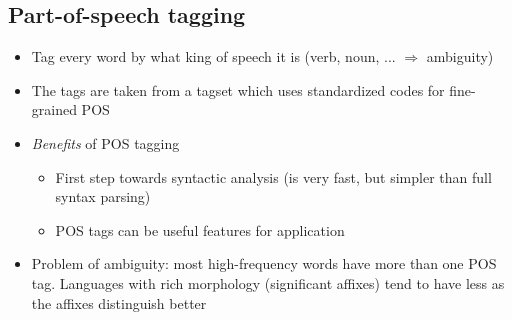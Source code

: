 \subsection{Part-of-speech tagging}
\begin{itemize}
	\item Tag every word by what king of speech it is (verb, noun, ... $\Rightarrow$ ambiguity)
	\item The tags are taken from a tagset which uses standardized codes for fine-grained POS
	\item \textit{Benefits} of POS tagging
	\begin{itemize}
		\item First step towards syntactic analysis (is very fast, but simpler than full syntax parsing)
		\item POS tags can be useful features for application
	\end{itemize}
	\item Problem of ambiguity: most high-frequency words have more than one POS tag. Languages with rich morphology (significant affixes) tend to have less as the affixes distinguish better
\end{itemize}
